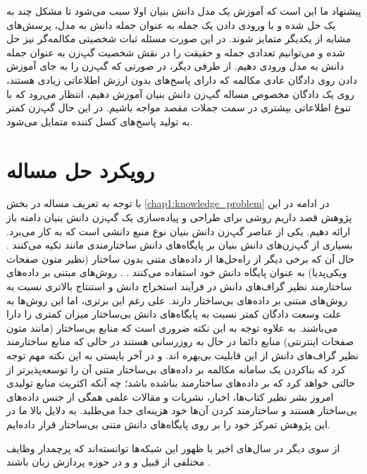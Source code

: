 پیشنهاد ما این است که آموزش یک مدل دانش بنیان اولا سبب می‌شود تا مشکل چند به یک حل شده و با ورودی دادن یک جمله به عنوان جمله دانش به مدل، پرسش‌های مشابه از یکدیگر متمایز شوند. در این صورت مسئله ثبات شخصیتی مکالمه‌گر نیز حل شده و می‌توانیم تعدادی جمله و حقیقت را در نقش شخصیت گپ‌زن به عنوان جمله دانش به مدل ورودی دهیم. از طرفی دیگر، در صورتی که گپ‌زن را به جای آموزش دادن روی دادگان عادی مکالمه که دارای پاسخ‌های بدون ارزش اطلاعاتی زیادی هستند، روی یک دادگان مخصوص مساله گپ‌زن دانش بنیان آموزش دهیم، انتظار می‌رود که با تنوع اطلاعاتی بیشتری در سمت جملات مقصد مواجه باشیم. در این حال گپ‌زن کمتر به تولید پاسخ‌های کسل کننده متمایل می‌شود. 


\section{رویکرد حل مساله} \label{chap1:problem_solving_approach}

با توجه به تعریف مساله در بخش 
\ref{chap1:knowledge_problem}
در ادامه  در این پژوهش قصد داریم روشی برای طراحی و پیاده‌سازی یک گپ‌زن دانش بنیان دامنه باز ارائه دهیم. 
یکی از عناصر گپ‌زن دانش بنیان نوع منبع دانشی است که به کار می‌برد. بسیاری از گپ‌زن‌های دانش بنیان بر پایگاه‌های دانش ساختارمندی مانند 
تکیه می‌کنند
\cite{zhou2018commonsense, tuan2019dykgchat}.
حال آن که برخی دیگر از راه‌حل‌ها از داده‌های متنی بدون ساختار (نظیر متون صفحات ویکی‌پدیا) به عنوان پایگاه دانش خود استفاده می‌کنند
\cite{wizard,a_knowledge_grounded,Topical_Chat}.
 . روش‌های مبتنی بر داده‌های ساختارمند نظیر گراف‌های دانش در فرآیند استخراج دانش و استنتاج 
بالاتری نسبت به روش‌های مبتنی بر داده‌های بی‌ساختار دارند.
علی رغم این برتری، اما این روش‌ها به علت وسعت دادگان کمتر نسبت به پایگاه‌های دانش بی‌ساختار میزان
کمتری را دارا می‌باشند.
به علاوه توجه به این نکته ضروری است که منابع بی‌ساختار (مانند متون صفحات اینترنتی) منابع دائما در حال به روزرسانی هستند در حالی که منابع ساختارمند نظیر گراف‌های‌ دانش از این قابلیت بی‌بهره اند. 
و در آخر بایستی به این نکته مهم توجه کرد که بناکردن یک سامانه مکالمه بر داده‌های بی‌ساختار متنی آن را توسعه‌پذیرتر از حالتی خواهد کرد که بر داده‌های ساختارمند بناشده باشد؛ چه آنکه اکثریت منابع تولیدی امروز بشر نظیر کتاب‌ها، اخبار، نشریات و مقالات علمی همگی از جنس‌ داده‌های بی‌ساختار هستند و ساختارمند کردن آن‌ها خود هزینه‌ای جدا می‌طلبد.
به دلایل بالا ما در این پژوهش تمرکز خود را بر روی پایگاه‌های دانش متنی بی‌ساختار قرار داده‌ایم.

از سوی دیگر در سال‌های اخیر با ظهور 
این شبکه‌ها توانسته‌اند که پرچمدار
 وظایف مختلفی از قبیل
و
و
  در حوزه پردازش زبان باشند
\cite{bert, gpt2}.

